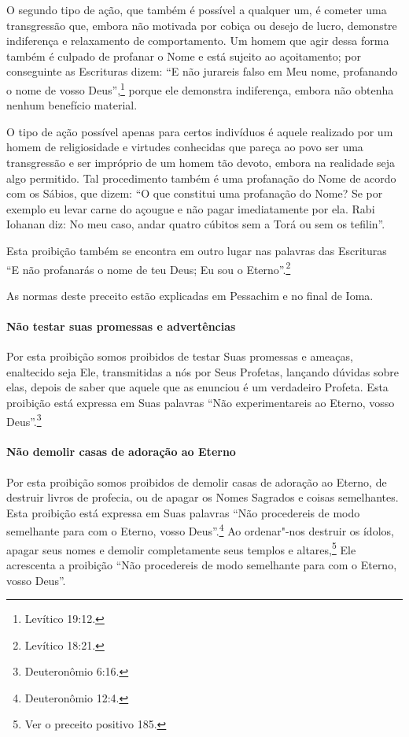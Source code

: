 \begin{multicols}{2}
O segundo tipo de ação, que também é possível a qualquer um, é cometer
uma transgressão que, embora não motivada por cobiça ou desejo de lucro,
demonstre indiferença e relaxamento de comportamento. Um homem que agir
dessa forma também é culpado de profanar o Nome e está sujeito ao
açoitamento; por conseguinte as Escrituras dizem: ``E não jurareis falso
em Meu nome, profanando o nome de vosso Deus'',\footnote{Levítico 19:12.} porque
ele demonstra indiferença, embora não obtenha nenhum benefício
material.

O tipo de ação possível apenas para certos indivíduos é aquele realizado
por um homem de religiosidade e virtudes conhecidas que pareça ao povo
ser uma transgressão e ser impróprio de um homem tão devoto, embora na
realidade seja algo permitido. Tal procedimento também é uma profanação
do Nome de acordo com os Sábios, que dizem: ``O que constitui uma
profanação do Nome? Se por exemplo eu levar carne do açougue e não
pagar imediatamente por ela. Rabi Iohanan\starr{} diz: No meu caso, andar
quatro cúbitos sem a Torá\starr{} ou sem os tefilin\starr''.

Esta proibição também se encontra em outro lugar nas palavras das
Escrituras ``E não profanarás o nome de teu Deus; Eu sou o Eterno''.\footnote{Levítico 18:21.}

As normas deste preceito estão explicadas em Pessachim\starr{} e no final de Ioma\starr.

\paragraph{Não testar suas promessas e advertências}

Por esta proibição somos proibidos de testar Suas promessas e ameaças,
enaltecido seja Ele, transmitidas a nós por Seus Profetas, lançando
dúvidas sobre elas, depois de saber que aquele que as enunciou é um
verdadeiro Profeta. Esta proibição está expressa em Suas palavras ``Não
experimentareis ao Eterno, vosso Deus''.\footnote{Deuteronômio 6:16.}

\paragraph{Não demolir casas de adoração ao Eterno}

Por esta proibição somos proibidos de demolir casas de adoração ao
Eterno, de destruir livros de profecia, ou de apagar os Nomes Sagrados e
coisas semelhantes. Esta proibição está expressa em Suas palavras ``Não
procedereis de modo semelhante para com o Eterno, vosso Deus''.\footnote{Deuteronômio 12:4.} Ao ordenar"-nos destruir os ídolos, apagar seus
nomes e demolir completamente seus templos e
altares,\footnote{Ver o preceito positivo 185.} Ele acrescenta a proibição ``Não
procedereis de modo semelhante para com o Eterno, vosso Deus''.


\end{multicols}
